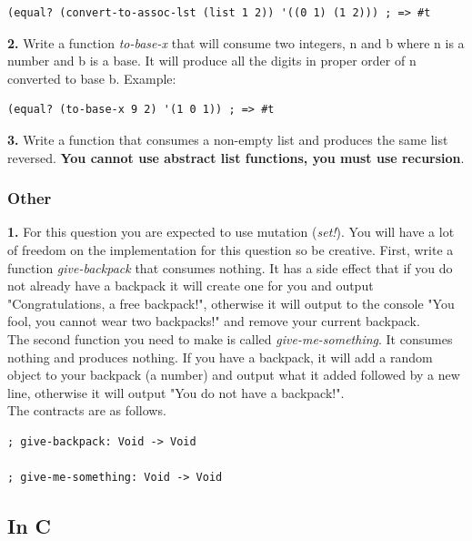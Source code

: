 \documentclass[12pt,extarticle]{article}
\begin{document}
\lstset {
	language=Lisp
}
\begin{lstlisting}
(equal? (convert-to-assoc-lst (list 1 2)) '((0 1) (1 2))) ; => #t
\end{lstlisting}

\noindent
\textbf{2.} Write a function \emph{to-base-x} that will consume two integers, n and b where n is a number and b is a base. It will produce all the digits in proper order of n converted to base b. Example:\\

\lstset {
	language=Lisp
}
\begin{lstlisting}
(equal? (to-base-x 9 2) '(1 0 1)) ; => #t
\end{lstlisting}

\noindent
\textbf{3.} Write a function that consumes a non-empty list and produces the same list reversed. \textbf{You cannot use abstract list functions, you must use recursion}.

\subsubsection{Other}

\textbf{1.} For this question you are expected to use mutation (\emph{set!}). You will have a lot of freedom on the implementation for this question so be creative. First, write a function \emph{give-backpack} that consumes nothing. It has a side effect that if you do not already have a backpack it will create one for you and output "Congratulations, a free backpack!", otherwise it will output to the console "You fool, you cannot wear two backpacks!" and remove your current backpack.\\

The second function you need to make is called \emph{give-me-something}. It consumes nothing and produces nothing. If you have a backpack, it will add a random object to your backpack (a number) and output what it added followed by a new line, otherwise it will output "You do not have a backpack!".\\

The contracts are as follows.\\

\lstset {
	language=Lisp
}
\begin{lstlisting}
; give-backpack: Void -> Void

; give-me-something: Void -> Void
\end{lstlisting}

\subsection{In C}
\end{document}

